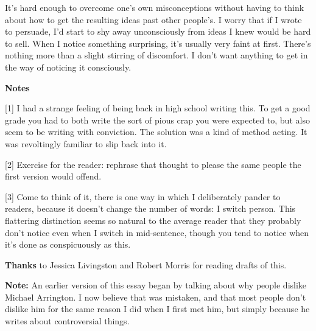 It's
                  hard enough to overcome one's own misconceptions without
                  having to think about how to get the resulting ideas past
                  other people's. I worry that if I wrote to persuade, I'd start
                  to shy away unconsciously from ideas I knew would be hard to
                  sell. When I notice something surprising, it's usually very
                  faint at first. There's nothing more than a slight stirring of
                  discomfort. I don't want anything to get in the way of
                  noticing it consciously.








                  \textbf{Notes}

[1] I had a strange feeling of being back in high school
                  writing this. To get a good grade you had to both write the
                  sort of pious crap you were expected to, but also seem to be
                  writing with conviction. The solution was a kind of method
                  acting. It was revoltingly familiar to slip back into it.

[2] Exercise for the reader: rephrase that thought to please
                  the same people the first version would offend.

[3] Come to think of it, there is one way in which I
                  deliberately pander to readers, because it doesn't change the
                  number of words: I switch person. This flattering distinction
                  seems so natural to the average reader that they probably
                  don't notice even when I switch in mid-sentence, though you
                  tend to notice when it's done as conspicuously as this.

\textbf{Thanks}
                  to Jessica Livingston and Robert Morris for reading drafts of
                  this.

\textbf{Note:} An earlier version of this essay
                  began by talking about why people dislike Michael Arrington. I
                  now believe that was mistaken, and that most people don't
                  dislike him for the same reason I did when I first met him,
                  but simply because he writes about controversial things.


              
            
          
            
              
                


                  
              
            
          
